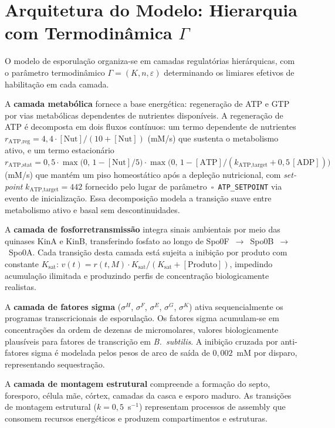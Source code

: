 \section{Arquitetura do Modelo: Hierarquia com Termodinâmica $\Gamma$}
\label{sec:arquitetura-hierarquica}

O modelo de esporulação organiza-se em camadas regulatórias hierárquicas,
com o parâmetro termodinâmico $\Gamma = (K, n, \varepsilon)$ determinando
os limiares efetivos de habilitação em cada camada.

A \textbf{camada metabólica} fornece a base energética: regeneração de ATP e
GTP por vias metabólicas dependentes de nutrientes disponíveis.
A regeneração de ATP é decomposta em dois fluxos contínuos: um termo
dependente de nutrientes
$r_{\text{ATP,reg}} = 4{,}4 \cdot [\text{Nut}] / (10 + [\text{Nut}])$
(mM/s) que sustenta o metabolismo ativo, e um termo estacionário
$r_{\text{ATP,stat}} = 0{,}5 \cdot \max\!\bigl(0,\,1 - [\text{Nut}]/5\bigr)
\cdot \max\!\bigl(0,\,1 - [\text{ATP}]/(k_{\text{ATP,target}} + 0{,}5\,
[\text{ADP}])\bigr)$ (mM/s) que mantém um piso homeostático após a
depleção nutricional, com \emph{set-point} $k_{\text{ATP,target}} = 442$
fornecido pelo lugar de parâmetro~$\square$~\texttt{ATP\_SETPOINT} via
evento de inicialização. Essa decomposição modela a transição suave
entre metabolismo ativo e basal sem descontinuidades.

A \textbf{camada de fosforretransmissão} integra sinais ambientais por meio
das quinases KinA e KinB, transferindo fosfato ao longo de
Spo0F~$\to$~Spo0B~$\to$~Spo0A.
Cada transição desta camada está sujeita a inibição por produto com
constante $K_{\text{sat}}$:
$v(t) = r(t, M) \cdot K_{\text{sat}} / (K_{\text{sat}} + [\text{Produto}])$,
impedindo acumulação ilimitada e produzindo perfis de concentração
biologicamente realistas.

A \textbf{camada de fatores sigma} ($\sigma^H$, $\sigma^F$, $\sigma^E$,
$\sigma^G$, $\sigma^K$) ativa sequencialmente os programas transcricionais
de esporulação.
Os fatores sigma acumulam-se em concentrações da ordem de dezenas de
micromolares, valores biologicamente plausíveis para fatores de transcrição
em \textit{B.~subtilis}.
A inibição cruzada por anti-fatores sigma é modelada pelos pesos de arco de
saída de $0{,}002$~mM por disparo, representando sequestração.

A \textbf{camada de montagem estrutural} compreende a formação do septo,
foresporo, célula mãe, córtex, camadas da casca e esporo maduro.
As transições de montagem estrutural ($k = 0{,}5$~s$^{-1}$) representam
processos de assembly que consomem recursos energéticos e produzem
compartimentos e estruturas.


